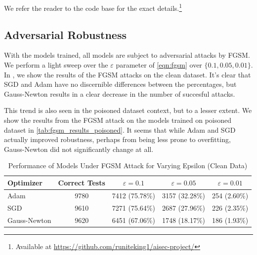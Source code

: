 \documentclass{article}
\begin{document}
    We refer the reader to the code base for the exact details.\footnote{Available at \url{https://github.com/runiteking1/aisec-project/}}


    \subsection{Adversarial Robustness}
    With the models trained, all models are subject to adversarial attacks by FGSM.
    We perform a light sweep over the $\varepsilon$ parameter of \cref{eqn:fgsm} over $\{0.1, 0.05, 0.01\}$.
    In , we show the results of the FGSM attacks on the clean dataset.
    It's clear that SGD and Adam have no discernible differences between the percentages, but Gauss-Newton results in a clear decrease in the number of succesful attacks.

    This trend is also seen in the poisoned dataset context, but to a lesser extent.
    We show the results from the FGSM attack on the models trained on poisoned dataset in \cref{tab:fgsm_results_poisoned}.
    It seems that while Adam and SGD actually improved robustness, perhaps from being less prone to overfitting, Gauss-Newton did not significantly change at all.


    \begin{table}[ht!]
        \centering
        \caption{Performance of Models Under FGSM Attack for Varying Epsilon (Clean Data)}
        \label{tab:fgsm_results}
        \begin{tabular}{|l|c|c|c|c|}
            \hline
            \textbf{Optimizer} & \textbf{Correct Tests} & $\varepsilon=0.1$ & $\varepsilon=0.05$ & $\varepsilon=0.01$ \\
            \hline
            Adam               & 9780                   & 7412 (75.78\%)    & 3157 (32.28\%)     & 254 (2.60\%)       \\
            \hline
            SGD                & 9610                   & 7271 (75.64\%)    & 2687 (27.96\%)     & 226 (2.35\%)       \\
            \hline
            Gauss-Newton       & 9620                   & 6451 (67.06\%)    & 1748 (18.17\%)     & 186 (1.93\%)       \\
            \hline
        \end{tabular}
    \end{table}
\end{document}
